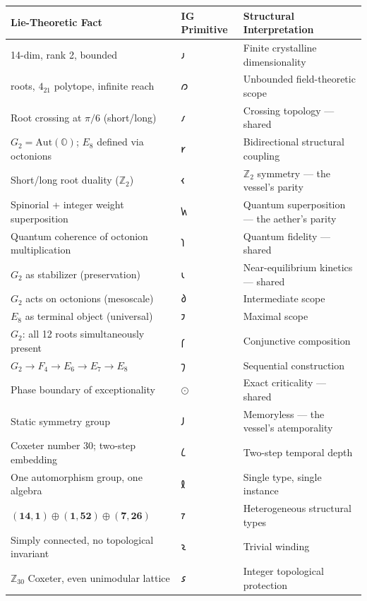 \documentclass[12pt,a4paper]{article}
\begin{document}
\begin{table}[htbp]
\centering
\small
{}
\begin{tabularx}{\textwidth}{>{\centering\arraybackslash}X >{\centering\arraybackslash}X >{\centering\arraybackslash}X}
\toprule
\rowcolor{gray!25}\textbf{Lie-Theoretic Fact} & \textbf{IG Primitive} & \textbf{Structural Interpretation} \\
\midrule
\rowcolors{1}{white}{gray!10}
14-dim, rank 2, bounded & $𐑨$ & Finite crystalline dimensionality \\
240 roots, $4_{21}$ polytope, infinite reach & $𐑼$ & Unbounded field-theoretic scope \\
Root crossing at $\pi/6$ (short/long) & $𐑥$ & Crossing topology --- shared \\
$G_2 = \text{Aut}(\mathbb{O})$; $E_8$ defined via octonions & $𐑾$ & Bidirectional structural coupling \\
Short/long root duality ($\mathbb{Z}_2$) & $𐑬$ & $\mathbb{Z}_2$ symmetry --- the vessel's parity \\
Spinorial + integer weight superposition & $𐑿$ & Quantum superposition --- the aether's parity \\
Quantum coherence of octonion multiplication & $𐑐$ & Quantum fidelity --- shared \\
$G_2$ as stabilizer (preservation) & $𐑧$ & Near-equilibrium kinetics --- shared \\
$G_2$ acts on octonions (mesoscale) & $𐑔$ & Intermediate scope \\
$E_8$ as terminal object (universal) & $𐑲$ & Maximal scope \\
$G_2$: all 12 roots simultaneously present & $𐑝$ & Conjunctive composition \\
$G_2 \to F_4 \to E_6 \to E_7 \to E_8$ & $𐑠$ & Sequential construction \\
Phase boundary of exceptionality & $⊙$ & Exact criticality --- shared \\
Static symmetry group & $𐑓$ & Memoryless --- the vessel's atemporality \\
Coxeter number 30; two-step embedding & $𐑖$ & Two-step temporal depth \\
One automorphism group, one algebra & $𐑙$ & Single type, single instance \\
$(\mathbf{14},\mathbf{1}) \oplus (\mathbf{1},\mathbf{52}) \oplus (\mathbf{7},\mathbf{26})$ & $𐑳$ & Heterogeneous structural types \\
Simply connected, no topological invariant & $𐑷$ & Trivial winding \\
$\mathbb{Z}_{30}$ Coxeter, even unimodular lattice & $𐑭$ & Integer topological protection \\
\bottomrule
\end{tabularx}
\end{table}
\end{document}
